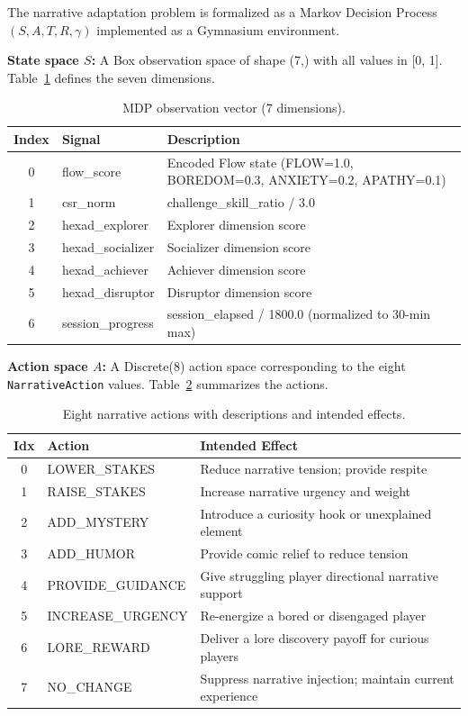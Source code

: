 \documentclass[12pt,a4paper]{report}
\begin{document}
The narrative adaptation problem is formalized as a Markov Decision Process $(S, A, T, R, \gamma)$ implemented as a Gymnasium environment.

\textbf{State space $S$:} A Box observation space of shape (7,) with all values in [0, 1]. Table~\ref{tab:mdp_state} defines the seven dimensions.

\begin{table}[H]
\centering
\caption{MDP observation vector (7 dimensions).}
\label{tab:mdp_state}
\small
\begin{tabular}{@{}clp{7cm}@{}}
\toprule
\textbf{Index} & \textbf{Signal} & \textbf{Description} \\
\midrule
0 & flow\_score & Encoded Flow state (FLOW=1.0, BOREDOM=0.3, ANXIETY=0.2, APATHY=0.1) \\
1 & csr\_norm & challenge\_skill\_ratio / 3.0 \\
2 & hexad\_explorer & Explorer dimension score \\
3 & hexad\_socializer & Socializer dimension score \\
4 & hexad\_achiever & Achiever dimension score \\
5 & hexad\_disruptor & Disruptor dimension score \\
6 & session\_progress & session\_elapsed / 1800.0 (normalized to 30-min max) \\
\bottomrule
\end{tabular}
\end{table}

\textbf{Action space $A$:} A Discrete(8) action space corresponding to the eight \texttt{NarrativeAction} values. Table~\ref{tab:actions} summarizes the actions.

\begin{table}[H]
\centering
\caption{Eight narrative actions with descriptions and intended effects.}
\label{tab:actions}
\small
\begin{tabular}{@{}cll@{}}
\toprule
\textbf{Idx} & \textbf{Action} & \textbf{Intended Effect} \\
\midrule
0 & LOWER\_STAKES & Reduce narrative tension; provide respite \\
1 & RAISE\_STAKES & Increase narrative urgency and weight \\
2 & ADD\_MYSTERY & Introduce a curiosity hook or unexplained element \\
3 & ADD\_HUMOR & Provide comic relief to reduce tension \\
4 & PROVIDE\_GUIDANCE & Give struggling player directional narrative support \\
5 & INCREASE\_URGENCY & Re-energize a bored or disengaged player \\
6 & LORE\_REWARD & Deliver a lore discovery payoff for curious players \\
7 & NO\_CHANGE & Suppress narrative injection; maintain current experience \\
\bottomrule
\end{tabular}
\end{table}
\end{document}
